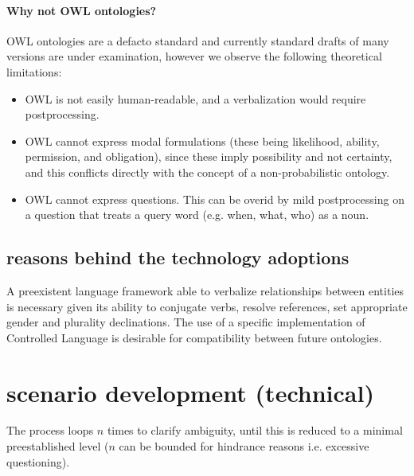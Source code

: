 \documentclass[10pt,a4paper]{article}
\begin{document}
\paragraph{Why not OWL ontologies?} OWL ontologies are a defacto standard and currently 
standard drafts of many versions are under examination, however we observe the following 
theoretical limitations:

\begin{itemize}
 \item OWL is not easily human-readable, and a verbalization would require postprocessing.
 \item OWL cannot express modal formulations (these being likelihood, ability, permission,
 and obligation), since these imply possibility and not certainty, and this conflicts directly 
 with the concept of a non-probabilistic ontology. 
 \item OWL cannot express questions. This can be overid by mild postprocessing on a question 
 that treats a query word (e.g. when, what, who) as a noun.
\end{itemize}

\subsection{reasons behind the technology adoptions}

A preexistent language framework able to verbalize relationships between entities 
is necessary given its ability to conjugate verbs, resolve references, set 
appropriate gender and plurality declinations. The use of a specific implementation 
of Controlled Language is desirable for compatibility between future ontologies.

\section{scenario development (technical)}

The process loops $n$ times to clarify ambiguity, until this is reduced to a minimal preestablished level ($n$ can be bounded for hindrance reasons i.e. excessive questioning).
\end{document}
